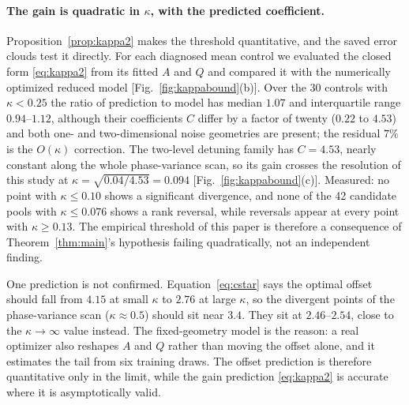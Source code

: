 \documentclass[aps,pra,twocolumn,superscriptaddress,reprint,nofootinbib,floatfix]{revtex4-2}
\theoremstyle{definition}
\begin{document}
\paragraph*{The gain is quadratic in $\kappa$, with the predicted
coefficient.} Proposition~\ref{prop:kappa2} makes the threshold quantitative,
and the saved error clouds test it directly. For each diagnosed mean control
we evaluated the closed form \eqref{eq:kappa2} from its fitted $A$ and $Q$ and
compared it with the numerically optimized reduced model
[Fig.~\ref{fig:kappabound}(b)]. Over the 30 controls with $\kappa<0.25$ the
ratio of prediction to model has median $1.07$ and interquartile range
$0.94$--$1.12$, although their coefficients $C$ differ by a factor of twenty
($0.22$ to $4.53$) and both one- and two-dimensional noise geometries are
present; the residual $7\%$ is the $O(\kappa)$ correction. The two-level
detuning family has $C=4.53$, nearly constant along the whole phase-variance
scan, so its gain crosses the resolution of this study at
$\kappa=\sqrt{0.04/4.53}=0.094$ [Fig.~\ref{fig:kappabound}(c)]. Measured:
no point with $\kappa\le0.10$ shows a significant divergence, and none of the
42 candidate pools with $\kappa\le0.076$ shows a rank reversal, while
reversals appear at every point with $\kappa\ge0.13$. The empirical threshold
of this paper is therefore a consequence of Theorem~\ref{thm:main}'s
hypothesis failing quadratically, not an independent finding.

One prediction is not confirmed. Equation~\eqref{eq:cstar} says the optimal
offset should fall from $4.15$ at small $\kappa$ to $2.76$ at large $\kappa$,
so the divergent points of the phase-variance scan ($\kappa\approx0.5$) should
sit near $3.4$. They sit at $2.46$--$2.54$, close to the $\kappa\to\infty$
value instead. The fixed-geometry model is the reason: a real optimizer also
reshapes $A$ and $Q$ rather than moving the offset alone, and it estimates the
tail from six training draws. The offset prediction is therefore quantitative
only in the limit, while the gain prediction \eqref{eq:kappa2} is accurate
where it is asymptotically valid.
\end{document}
